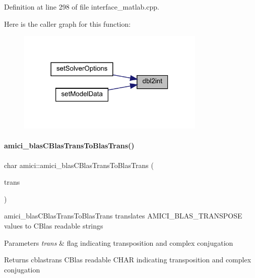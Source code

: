 Definition at line 298 of file interface\+\_\+matlab.\+cpp.

Here is the caller graph for this function\+:
\nopagebreak
\begin{figure}[H]
\begin{center}
\leavevmode
\includegraphics[width=254pt]{namespaceamici_a204c68962100d0020a37392fef2e95e2_icgraph}
\end{center}
\end{figure}
\mbox{\label{namespaceamici_a800e4c3e12f712281a4355e765402260}} 
\paragraph{\texorpdfstring{amici\_blasCBlasTransToBlasTrans()}{amici\_blasCBlasTransToBlasTrans()}}
{\footnotesize\ttfamily char amici\+::amici\+\_\+blas\+C\+Blas\+Trans\+To\+Blas\+Trans (\begin{DoxyParamCaption}\item[{\mbox{\hyperlink{namespaceamici_a0f0ec77c6c8f48d9c5cb50d54899afae}{B\+L\+A\+S\+Transpose}}}]{trans }\end{DoxyParamCaption})}

amici\+\_\+blas\+C\+Blas\+Trans\+To\+Blas\+Trans translates A\+M\+I\+C\+I\+\_\+\+B\+L\+A\+S\+\_\+\+T\+R\+A\+N\+S\+P\+O\+SE values to C\+Blas readable strings


\begin{DoxyParams}{Parameters}
{\em trans} & flag indicating transposition and complex conjugation\\
\hline
\end{DoxyParams}
\begin{DoxyReturn}{Returns}
cblastrans C\+Blas readable C\+H\+AR indicating transposition and complex conjugation 
\end{DoxyReturn}


